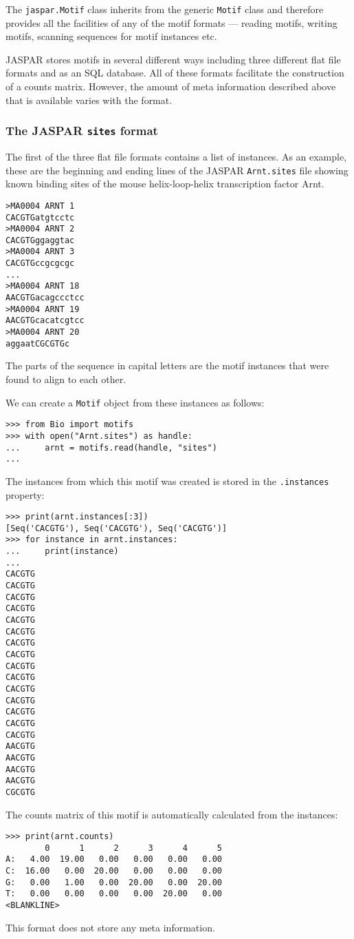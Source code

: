 The \verb+jaspar.Motif+ class inherits from the generic \verb+Motif+ class and therefore provides all the facilities of any of the motif formats --- reading motifs, writing motifs, scanning sequences for motif instances etc.

JASPAR stores motifs in several different ways including three different flat file formats and as an SQL database. All of these formats facilitate the construction of a counts matrix. However, the amount of meta information described above that is available varies with the format.

\subsubsection*{The JASPAR \texttt{sites} format}

The first of the three flat file formats contains a list of instances. As an example, these are the beginning and ending lines of the JASPAR \verb+Arnt.sites+ file showing known binding sites of the mouse helix-loop-helix transcription factor Arnt.
\begin{verbatim}
>MA0004 ARNT 1
CACGTGatgtcctc
>MA0004 ARNT 2
CACGTGggaggtac
>MA0004 ARNT 3
CACGTGccgcgcgc
...
>MA0004 ARNT 18
AACGTGacagccctcc
>MA0004 ARNT 19
AACGTGcacatcgtcc
>MA0004 ARNT 20
aggaatCGCGTGc
\end{verbatim}
The parts of the sequence in capital letters are the motif instances that were found to align to each other.

We can create a \verb+Motif+ object from these instances as follows:

\begin{verbatim}
>>> from Bio import motifs
>>> with open("Arnt.sites") as handle:
...     arnt = motifs.read(handle, "sites")
...
\end{verbatim}
The instances from which this motif was created is stored in the \verb+.instances+ property:

\begin{verbatim}
>>> print(arnt.instances[:3])
[Seq('CACGTG'), Seq('CACGTG'), Seq('CACGTG')]
>>> for instance in arnt.instances:
...     print(instance)
...
CACGTG
CACGTG
CACGTG
CACGTG
CACGTG
CACGTG
CACGTG
CACGTG
CACGTG
CACGTG
CACGTG
CACGTG
CACGTG
CACGTG
CACGTG
AACGTG
AACGTG
AACGTG
AACGTG
CGCGTG
\end{verbatim}
The counts matrix of this motif is automatically calculated from the instances:

\begin{verbatim}
>>> print(arnt.counts)
        0      1      2      3      4      5
A:   4.00  19.00   0.00   0.00   0.00   0.00
C:  16.00   0.00  20.00   0.00   0.00   0.00
G:   0.00   1.00   0.00  20.00   0.00  20.00
T:   0.00   0.00   0.00   0.00  20.00   0.00
<BLANKLINE>
\end{verbatim}
This format does not store any meta information.

